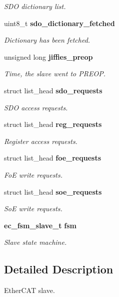 \begin{DoxyCompactItemize}
\begin{DoxyCompactList}\small\item\em S\-D\-O dictionary list. \end{DoxyCompactList}\item 
uint8\-\_\-t {\bf sdo\-\_\-dictionary\-\_\-fetched}
\begin{DoxyCompactList}\small\item\em Dictionary has been fetched. \end{DoxyCompactList}\item 
unsigned long {\bf jiffies\-\_\-preop}
\begin{DoxyCompactList}\small\item\em Time, the slave went to P\-R\-E\-O\-P. \end{DoxyCompactList}\item 
struct list\-\_\-head {\bf sdo\-\_\-requests}
\begin{DoxyCompactList}\small\item\em S\-D\-O access requests. \end{DoxyCompactList}\item 
struct list\-\_\-head {\bf reg\-\_\-requests}
\begin{DoxyCompactList}\small\item\em Register access requests. \end{DoxyCompactList}\item 
struct list\-\_\-head {\bf foe\-\_\-requests}
\begin{DoxyCompactList}\small\item\em Fo\-E write requests. \end{DoxyCompactList}\item 
struct list\-\_\-head {\bf soe\-\_\-requests}
\begin{DoxyCompactList}\small\item\em So\-E write requests. \end{DoxyCompactList}\item 
{\bf ec\-\_\-fsm\-\_\-slave\-\_\-t} {\bf fsm}
\begin{DoxyCompactList}\small\item\em Slave state machine. \end{DoxyCompactList}\end{DoxyCompactItemize}


\subsection{Detailed Description}
Ether\-C\-A\-T slave. 

